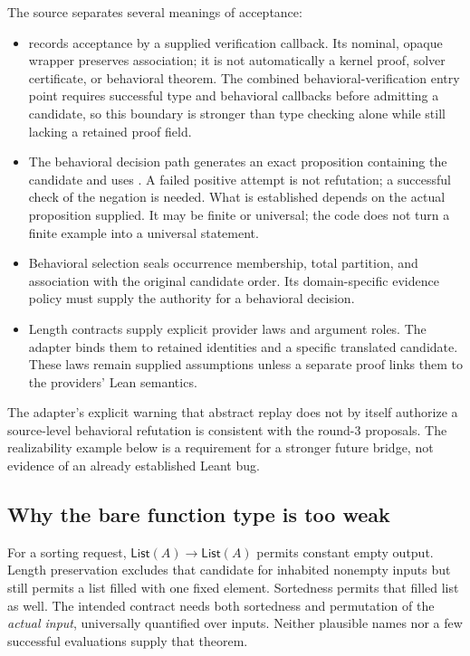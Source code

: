 \documentclass[11pt,letterpaper]{article}
\newcommand{\code}[1]{\texttt{\detokenize{#1}}}
\theoremstyle{definition}\newtheorem{definition}[proposition]{Definition}
\theoremstyle{remark}\newtheorem{remark}[proposition]{Remark}
\begin{document}
The source separates several meanings of acceptance:
\begin{itemize}
\item \code{Verified} records acceptance by a supplied verification callback.
Its nominal, opaque wrapper preserves association; it is not automatically a
kernel proof, solver certificate, or behavioral theorem.
The combined behavioral-verification entry point requires successful type and
behavioral callbacks before admitting a candidate, so this boundary is stronger
than type checking alone while still lacking a retained proof field.
\item The behavioral decision path generates an exact proposition containing
the candidate and uses \code{decide}. A failed positive attempt is not
refutation; a successful check of the negation is needed. What is established
depends on the actual proposition supplied. It may be finite or universal;
the code does not turn a finite example into a universal statement.
\item Behavioral selection seals occurrence membership, total partition, and
association with the original candidate order. Its domain-specific evidence
policy must supply the authority for a behavioral decision.
\item Length contracts supply explicit provider laws and argument roles. The
adapter binds them to retained identities and a specific translated candidate.
These laws remain supplied assumptions unless a separate proof links them to
the providers' Lean semantics.
\end{itemize}

The adapter's explicit warning that abstract replay does not by itself
authorize a source-level behavioral refutation is consistent with the
round-3 proposals. The realizability example below is a requirement for a
stronger future bridge, not evidence of an already established Leant bug.

\subsection{Why the bare function type is too weak}
For a sorting request, $\mathsf{List}(A)\to\mathsf{List}(A)$ permits constant
empty output. Length preservation excludes that candidate for inhabited
nonempty inputs but still permits a list filled with one fixed element.
Sortedness permits that filled list as well. The intended contract needs both
sortedness and permutation of the \emph{actual input}, universally quantified
over inputs. Neither plausible names nor a few successful evaluations supply
that theorem.
\end{document}
